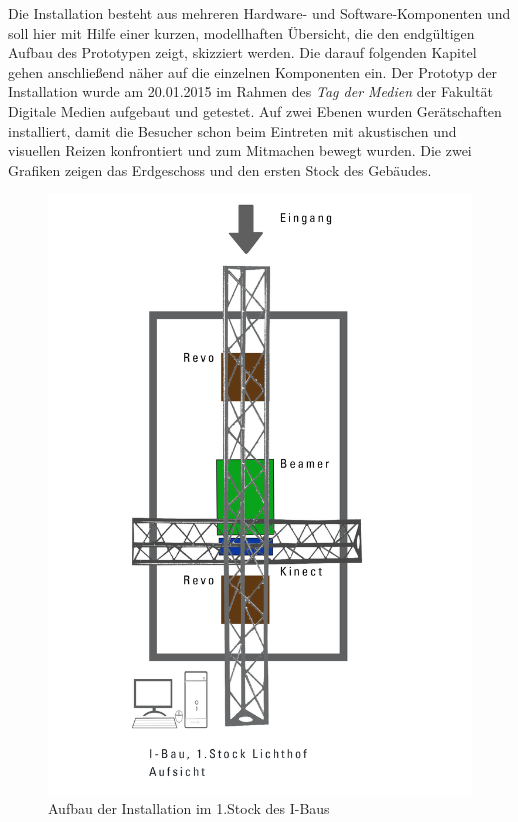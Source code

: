 
Die Installation besteht aus mehreren Hardware- und Software-Komponenten und soll hier mit Hilfe einer kurzen, modellhaften Übersicht, die den endgültigen Aufbau des Prototypen zeigt, skizziert werden. Die darauf folgenden Kapitel gehen anschließend näher auf die einzelnen Komponenten ein. Der Prototyp der Installation wurde am 20.01.2015 im Rahmen des \textit{Tag der Medien} der Fakultät Digitale Medien aufgebaut und getestet. Auf zwei Ebenen wurden Gerätschaften installiert, damit die Besucher schon beim Eintreten mit akustischen und visuellen Reizen konfrontiert und zum Mitmachen bewegt wurden. Die zwei Grafiken zeigen das Erdgeschoss und den ersten Stock des Gebäudes.
\begin{figure}[htbp]
	\centering
		\includegraphics[width=1.0\textwidth]{images/ModelFirstFloor.png}
	\caption{Aufbau der Installation im 1.Stock des I-Baus}
	\label{fig:ModelFF}
\end{figure}

